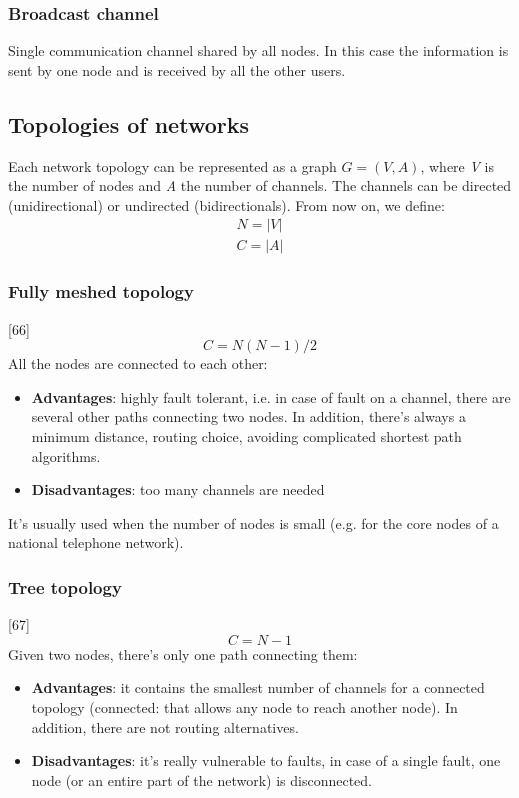 \subsubsection{Broadcast channel}
Single communication channel shared by all nodes. In this case the information is sent by one node and is received by all the other users.

\subsection{Topologies of networks}
Each network topology can be represented as a graph \(G=(V,A)\), where \textit{V} is the number of nodes and \textit{A} the number of channels. The channels can be directed (unidirectional) or undirected (bidirectionals). From now on, we define:
\begin{align*}
    N=|V|\\C=|A|
\end{align*}

\subsubsection{Fully meshed topology}
[66]
\[C=N(N-1)/2\]
All the nodes are connected to each other:
\begin{itemize}
    \item \textbf{Advantages}: highly fault tolerant, i.e. in case of fault on a channel, there are several other paths connecting two nodes. In addition, there's always a minimum distance, routing choice, avoiding complicated shortest path algorithms.
    \item \textbf{Disadvantages}: too many channels are needed
\end{itemize}

\noindent It's usually used when the number of nodes is small (e.g. for the core nodes of a national telephone network).

\subsubsection{Tree topology}
[67]
\[C=N-1\]
Given two nodes, there's only one path connecting them:
\begin{itemize}
    \item \textbf{Advantages}: it contains the smallest number of channels for a connected topology (connected: that allows any node to reach another node). In addition, there are not routing alternatives.
    \item \textbf{Disadvantages}: it's really vulnerable to faults, in case of a single fault, one node (or an entire part of the network) is disconnected.
\end{itemize}

